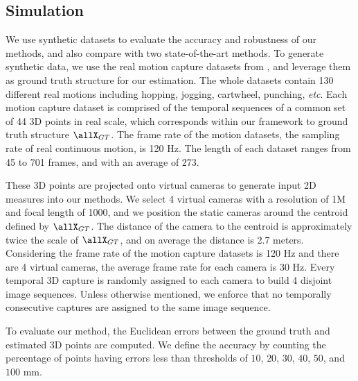 \subsection{Simulation}
We use synthetic datasets to evaluate the accuracy and robustness of our methods, and also compare with two state-of-the-art methods.
To generate synthetic data, we use the real motion capture datasets from \cite{cg-2007-2}, and leverage them as ground truth structure for our estimation.
The whole datasets contain 130 different real motions including hopping, jogging, cartwheel, punching, \emph{etc}.
Each motion capture dataset is comprised of the temporal sequences of a common set of 44 3D points in real scale, which corresponds within our framework to ground truth structure $\allX_{GT}$. The frame rate of the motion datasets, \ie the sampling rate of real continuous motion, is 120 Hz. The length of each dataset ranges from 45 to 701 frames, and with an average of 273. 

These 3D points are projected onto virtual cameras to generate input 2D measures into our methods.
We select 4 virtual cameras with a resolution of 1M and focal length of 1000, and we position the static cameras around the centroid defined by $\allX_{GT}$. 
The distance of the camera to the centroid is approximately twice the scale of $\allX_{GT}$, and on average the distance is 2.7 meters.
Considering the frame rate of the motion capture datasets is 120 Hz and there are 4 virtual cameras, the average frame rate for each camera is 30 Hz.
Every temporal 3D capture is randomly assigned to each camera to build 4 disjoint image sequences. %
Unless otherwise mentioned, we enforce that no temporally consecutive captures are assigned to the same image sequence.

To evaluate our method, the Euclidean errors between the ground truth and estimated 3D points are computed.
We define the accuracy by counting the percentage of points having errors less than thresholds of $10$, $20$, $30$, $40$, $50$, and $100$ mm.

